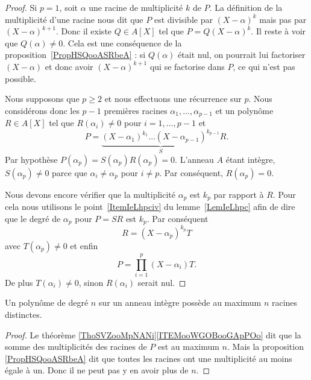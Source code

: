 \begin{proof}
	Si \( p=1\), soit \( \alpha\) une racine de multiplicité \( k\) de \( P\). La définition de la multiplicité d'une racine nous dit que \( P\) est divisible par \( (X-\alpha)^k\) mais pas par \( (X-\alpha)^{k+1}\). Donc il existe \( Q\in A[X]\) tel que \( P=Q(X-\alpha)^k\). Il reste à voir que \( Q(\alpha)\neq 0\). Cela est une conséquence de la proposition~\ref{PropHSQooASRbeA} : si \( Q(\alpha)\) était nul, on pourrait lui factoriser \( (X-\alpha)\) et donc avoir \( (X-\alpha)^{k+1}\) qui se factorise dans \( P\), ce qui n'est pas possible.

	Nous supposons que \( p\geq 2\) et nous effectuons une récurrence sur \( p\). Nous considérons donc les \( p-1\) premières racines \( \alpha_1,\ldots, \alpha_{p-1}\) et un polynôme \( R\in A[X]\) tel que \( R(\alpha_i)\neq 0\) pour \( i=1,\ldots, p-1\) et
	\begin{equation}
		P=\underbrace{(X-\alpha_1)^{k_1}\ldots (X-\alpha_{p-1})^{k_{p-1}}}_SR.
	\end{equation}
	Par hypothèse \( P(\alpha_p)=S(\alpha_p)R(\alpha_p)=0\). L'anneau \( A\) étant intègre, \( S(\alpha_p)\neq 0\) parce que \( \alpha_i\neq \alpha_p\) pour \( i\neq p\). Par conséquent, \( R(\alpha_p)=0\).

	Nous devons encore vérifier que la multiplicité \( \alpha_p\) est \( k_p\) par rapport à \( R\). Pour cela nous utilisons le point~\ref{ItemIeLhpciv} du lemme~\ref{LemIeLhpc} afin de dire que le degré de \( \alpha_p\) pour \( P=SR\) est \( k_p\). Par conséquent
	\begin{equation}
		R=(X-\alpha_p)^{k_p}T
	\end{equation}
	avec \( T(\alpha_p)\neq 0\) et enfin
	\begin{equation}
		P=\prod_{i=1}^p(X-\alpha_i)T.
	\end{equation}
	De plus \( T(\alpha_i)\neq 0\), sinon \( R(\alpha_i)\) serait nul.
\end{proof}

\begin{corollary}       \label{CORooUGJGooBofWLr}
	Un polynôme de degré \( n\) sur un anneau intègre possède au maximum \( n\) racines distinctes.
\end{corollary}

\begin{proof}
	Le théorème \ref{ThoSVZooMpNANi}\ref{ITEMooWGOBooGApPOo} dit que la somme des multiplicités des racines de \( P\) est au maximum \( n\). Mais la proposition \ref{PropHSQooASRbeA} dit que toutes les racines ont une multiplicité au moins égale à un. Donc il ne peut pas y en avoir plus de \( n\).
\end{proof}

